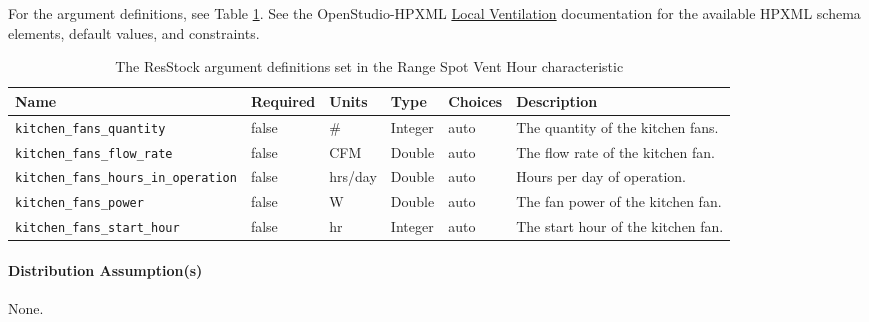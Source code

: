 For the argument definitions, see Table \ref{table:hc_arg_def_range_fan}. See the OpenStudio-HPXML \href{https://openstudio-hpxml.readthedocs.io/en/v1.8.1/workflow_inputs.html#hpxml-local-ventilation-fans}{Local Ventilation} documentation for the available HPXML schema elements, default values, and constraints.

\begin{longtable}[]{|p{3.5cm}|p{1.5cm}|p{1.3cm}|p{1.1cm}|p{}|p{3.3cm}|} \caption{The ResStock argument definitions set in the Range Spot Vent Hour characteristic} \label{table:hc_arg_def_range_fan}\\
\toprule\noalign{}
Name & Required & Units & Type & Choices & Description \\
\midrule\noalign{}
\endhead
\bottomrule\noalign{}
\endlastfoot
\texttt{kitchen\_fans\_quantity} & false & \# & Integer & auto & The
quantity of the kitchen fans.  \\ \hline
\texttt{kitchen\_fans\_flow\_rate} & false & CFM & Double & auto & The
flow rate of the kitchen fan.  \\ \hline
\texttt{kitchen\_fans\_hours\_in\_operation} & false & hrs/day & Double
& auto &  Hours per day of operation.\\ \hline
\texttt{kitchen\_fans\_power} & false & W & Double & auto & The fan
power of the kitchen fan. \\ \hline
\texttt{kitchen\_fans\_start\_hour} & false & hr & Integer & auto & The
start hour of the kitchen fan.  \\
\end{longtable}

\paragraph{Distribution Assumption(s)}
None.
